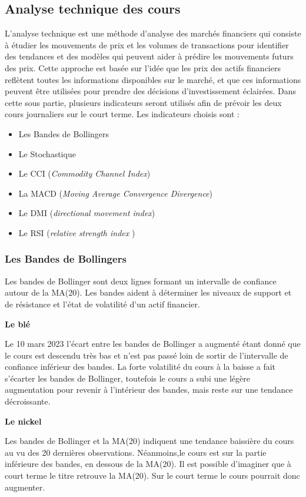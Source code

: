 \subsection{Analyse technique des cours}
L'analyse technique est une méthode d'analyse des marchés financiers qui consiste à étudier les mouvements de prix et les volumes de transactions pour identifier des 
tendances et des modèles qui peuvent aider à prédire les mouvements futurs des prix. Cette approche est basée sur l'idée que les prix des actifs financiers reflètent 
toutes les informations disponibles sur le marché, et que ces informations peuvent être utilisées pour prendre des décisions d'investissement éclairées. Dans cette sous
partie, plusieurs indicateurs seront utilisés afin de prévoir les deux cours journaliers sur le court terme. Les indicateurs choisis sont :
\begin{itemize}
    \item Les Bandes de Bollingers
    \item Le Stochastique
    \item Le CCI (\textit{Commodity Channel Index})
    \item La MACD (\textit{Moving Average Convergence Divergence})
    \item Le DMI (\textit{directional movement index})
    \item Le RSI (\textit{relative strength index} )
\end{itemize}


\subsubsection*{Les Bandes de Bollingers}
Les bandes de Bollinger sont deux lignes formant un intervalle de confiance autour de la MA(20). Les bandes aident à déterminer les niveaux de support et de résistance et 
l'état de volatilité d'un actif financier.
\begin{multicols}{2}
\centerline{\textbf{Le blé}}
Le 10 mars 2023 l'écart entre les bandes de Bollinger a augmenté étant donné que le cours est descendu très bas et n'est pas passé loin de sortir de l'intervalle 
de confiance inférieur des bandes. La forte volatilité du cours à la baisse a fait s'écarter les bandes de Bollinger, toutefois le cours a subi une légère augmentation 
pour revenir à l'intérieur des bandes, mais reste sur une tendance décroissante. 

\columnbreak
\centerline{\textbf{Le nickel}}
Les bandes de Bollinger et la MA(20) indiquent une tendance baissière du cours au vu des 20 dernières observations. Néanmoins,le cours est sur la partie inférieure des bandes, en dessous de la MA(20). Il est possible d'imaginer que à court terme le titre retrouve la MA(20). Sur le court terme le cours pourrait donc augmenter.
\end{multicols}

